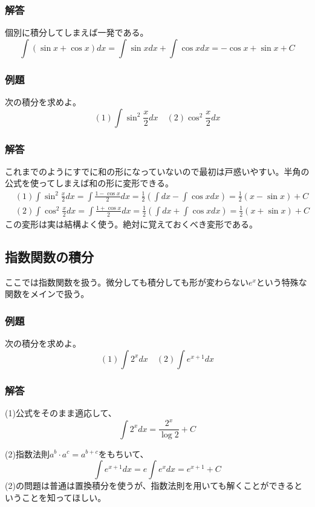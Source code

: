\documentclass[a4j,dvipdfmx]{jsarticle}
\begin{document}
\subsubsection*{解答}
個別に積分してしまえば一発である。
\begin{equation*}
    \int(\sin x+\cos x)dx=\int \sin xdx+\int \cos xdx=-\cos x+\sin x+C
\end{equation*}
\subsubsection{例題}
次の積分を求めよ。
\begin{equation*}
    (1)\int \sin^2 \frac{x}{2}dx\quad (2)\cos^2 \frac{x}{2}dx 
\end{equation*}
\subsubsection*{解答}
これまでのようにすでに和の形になっていないので最初は戸惑いやすい。半角の公式を使ってしまえば和の形に変形できる。
\begin{align*}
    &(1)\int \sin^2 \frac{x}{2}dx=\int\frac{1-\cos x}{2}dx=\frac{1}{2}(\int dx-\int \cos xdx)=\frac{1}{2}(x-\sin x)+C\\
    &(2)\int \cos^2 \frac{x}{2}dx=\int\frac{1+\cos x}{2}dx=\frac{1}{2}(\int dx+\int \cos xdx)=\frac{1}{2}(x+\sin x)+C 
\end{align*}
この変形は実は結構よく使う。絶対に覚えておくべき変形である。
\newpage
\subsection{指数関数の積分}
ここでは指数関数を扱う。微分しても積分しても形が変わらない$e^x$という特殊な関数をメインで扱う。
\subsubsection{例題}
次の積分を求めよ。
\begin{equation*}
    (1)\int 2^x dx\quad(2)\int e^{x+1}dx
\end{equation*}
\subsubsection*{解答}
(1)公式をそのまま適応して、
\begin{equation*}
    \int 2^x dx=\frac{2^x}{\log 2}+C
\end{equation*}

(2)指数法則$a^b\cdot a^c=a^{b+c}$をもちいて、
\begin{equation*}
    \int e^{x+1}dx=e\int e^xdx=e^{x+1}+C
\end{equation*}
(2)の問題は普通は置換積分を使うが、指数法則を用いても解くことができるということを知ってほしい。\\
\hrulefill
\end{document}
